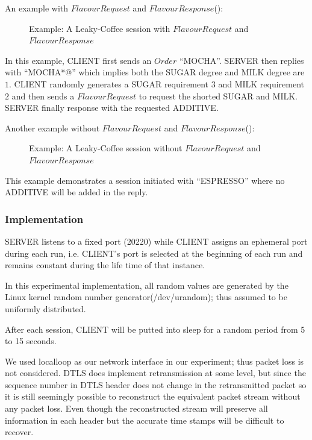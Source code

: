\begin{example}
An example with $FlavourRequest$ and $FlavourResponse$():

{
\begin{figure}[H]
\centering
\resizebox{8cm}{!}
{}
\caption{Example: A Leaky-Coffee session with $FlavourRequest$ and $FlavourResponse$}
\label{Fig: Leaky-Coffee Example1}
\end{figure}
}
In this example, CLIENT first sends an $Order$ “MOCHA”. SERVER then replies with “MOCHA*@” which implies both the SUGAR degree and MILK degree are $1$. CLIENT randomly generates a SUGAR requirement $3$ and MILK requirement $2$ and then sends a $FlavourRequest$ to request the shorted SUGAR and MILK. SERVER finally response with the requested ADDITIVE.
\end{example}

\begin{example}
Another example without $FlavourRequest$ and $FlavourResponse$():

\begin{figure}[H]
\centering
\resizebox{6cm}{!}
{}
\caption{Example: A Leaky-Coffee session without $FlavourRequest$ and $FlavourResponse$}
\label{Fig: Leaky-Coffee Example2}
\end{figure}

This example demonstrates a session initiated with “ESPRESSO” where no ADDITIVE will be added in the reply.
\end{example}

\subsubsection{Implementation}
SERVER listens to a fixed port (20220) while CLIENT assigns an ephemeral port during each run, i.e. CLIENT’s port is selected at the beginning of each run and remains constant during the life time of that instance.

In this experimental implementation, all random values are generated by the Linux kernel random number generator(/dev/urandom); thus assumed to be uniformly distributed. 

After each session, CLIENT will be putted into sleep for a random period from 5 to 15 seconds.

We used localloop as our network interface in our experiment; thus packet loss is not considered. DTLS does implement retransmission at some level, but since the sequence number in DTLS header does not change in the retransmitted packet so it is still seemingly possible to reconstruct the equivalent packet stream without any packet loss. Even though the reconstructed stream will preserve all information in each header but the accurate time stamps will be difficult to recover.

